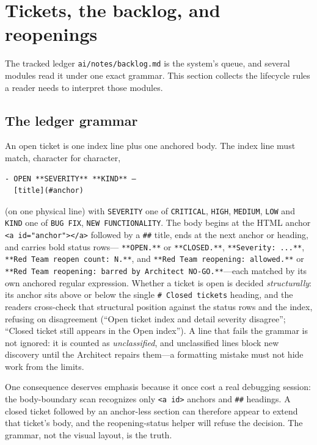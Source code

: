 \documentclass[10pt,aps,prd,twocolumn,nofootinbib]{revtex4-2}
\newcommand{\code}[1]{\texttt{#1}}
\newcommand{\file}[1]{\texttt{#1}}
\begin{document}
\section{Tickets, the backlog, and reopenings}
\label{sec:tickets}

The tracked ledger \file{ai/notes/backlog.md} is the system's queue,
and several modules read it under one exact grammar.  This section
collects the lifecycle rules a reader needs to interpret those
modules.

\subsection{The ledger grammar}

An open ticket is one index line plus one anchored body.  The index
line must match, character for character,

\begin{verbatim}
- OPEN **SEVERITY** **KIND** —
  [title](#anchor)
\end{verbatim}

\noindent (on one physical line) with \code{SEVERITY} one of
\code{CRITICAL}, \code{HIGH}, \code{MEDIUM}, \code{LOW} and
\code{KIND} one of \code{BUG FIX}, \code{NEW FUNCTIONALITY}.  The
body begins at the HTML anchor
\code{<a id="anchor"></a>} followed by a \code{\#\#} title, ends at
the next anchor or heading, and carries bold status rows---
\code{**OPEN.**} or \code{**CLOSED.**}, \code{**Severity: ...**},
\code{**Red Team reopen count: N.**}, and \code{**Red Team reopening:
allowed.**} or \code{**Red Team reopening: barred by Architect
NO-GO.**}---each matched by its own anchored regular expression.
Whether a ticket is open is decided \emph{structurally}: its anchor
sits above or below the single \code{\# Closed tickets} heading, and
the readers cross-check that structural position against the status
rows and the index, refusing on disagreement (``Open ticket index and
detail severity disagree''; ``Closed ticket still appears in the Open
index'').  A line that fails the grammar is not ignored: it is counted
as \emph{unclassified}, and unclassified lines block new discovery
until the Architect repairs them---a formatting mistake must not hide
work from the limits.

One consequence deserves emphasis because it once cost a real
debugging session: the body-boundary scan recognizes only \code{<a
id>} anchors and \code{\#\#} headings.  A closed ticket followed by an
anchor-less section can therefore appear to extend that ticket's body,
and the reopening-status helper will refuse the decision.  The
grammar, not the visual layout, is the truth.
\end{document}
